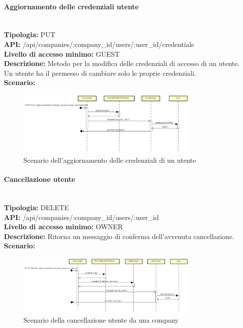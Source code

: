\newpage
\paragraph{Aggiornamento delle credenziali utente}\mbox{}\\
\textbf{Tipologia:} PUT \\
\textbf{API:} /api/companies/:company\_id/users/:user\_id/credentials \\
\textbf{Livello di accesso minimo:} GUEST \\
\textbf{Descrizione:} Metodo per la modifica delle credenziali di accesso di un utente. Un utente ha il permesso di cambiare solo le proprie credenziali. \\
\textbf{Scenario:} 
\begin{figure}[H]
\centering
\includegraphics[width=0.8\textwidth]{res/sections/backend/sequence/(PUT)credenzialiUtente.png}
\caption{Scenario dell'aggiornamento delle credenziali di un utente}
\end{figure}

\newpage
\paragraph{Cancellazione utente}\mbox{}\\
\textbf{Tipologia:} DELETE \\
\textbf{API:} /api/companies/:company\_id/users/:user\_id \\
\textbf{Livello di accesso minimo:} OWNER \\
\textbf{Descrizione:} Ritorna un messaggio di conferma dell'avvenuta cancellazione. \\
\textbf{Scenario:} 
\begin{figure}[H]
\centering
\includegraphics[width=0.8\textwidth]{res/sections/backend/sequence/(DELETE)user.png}
\caption{Scenario della cancellazione utente da una company}
\end{figure}


